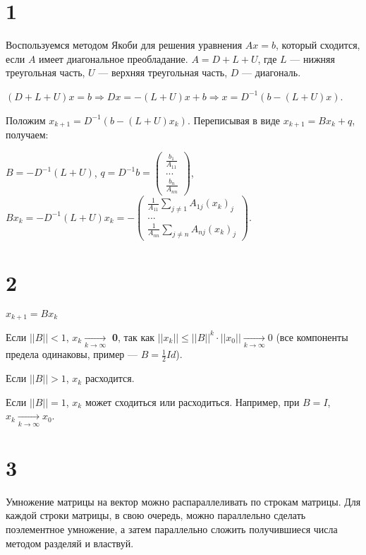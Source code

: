 \documentclass[12pt,a4paper]{article}
\begin{document}
\section*{1}
Воспользуемся методом Якоби для решения уравнения $Ax=b$, который сходится, если $A$ имеет диагональное преобладание. $A=D+L+U$, где $L$ --- нижняя треугольная часть, $U$ --- верхняя треугольная часть, $D$ --- диагональ. 

$(D+L+U)x=b \Rightarrow Dx=-(L+U)x+b \Rightarrow x=D^{-1}(b-(L+U)x)$. 

Положим $x_{k+1}=D^{-1}(b-(L+U)x_k)$. Переписывая в виде $x_{k+1}=Bx_k+q$, получаем:

$B=-D^{-1}(L+U)$, 
$q=D^{-1}b=\begin{pmatrix}
    \frac{b_1}{A_{11}} \\
    ...\\
    \frac{b_n}{A_{nn}}
\end{pmatrix}$,
$Bx_k=-D^{-1}(L+U)x_k=-\begin{pmatrix}
    \frac{1}{A_{11}}\sum\limits_{j\not=1} A_{1j}(x_k)_j \\
    ... \\
    \frac{1}{A_{nn}}\sum\limits_{j\not=n} A_{nj}(x_k)_j
\end{pmatrix}$.

\section*{2}
$x_{k+1}=Bx_k$

Если $||B||<1$, $x_k \xrightarrow[k \to \infty]{}$ \textbf{0}, так как $||x_k||\leq ||B||^k\cdot ||x_0|| \xrightarrow[k \to \infty]{} 0$ (все компоненты предела одинаковы, пример --- $B=\frac{1}{2}Id$).

Если $||B||>1$, $x_k$ расходится.

Если $||B||=1$, $x_k$ может сходиться или расходиться. Например, при $B=I$, $x_k \xrightarrow[k \to \infty]{} x_0$.

\section*{3}
Умножение матрицы на вектор можно распараллеливать по строкам матрицы. Для каждой строки матрицы, в свою очередь, можно параллельно сделать поэлементное умножение, а затем параллельно сложить получившиеся числа методом разделяй и властвуй.
\end{document}
